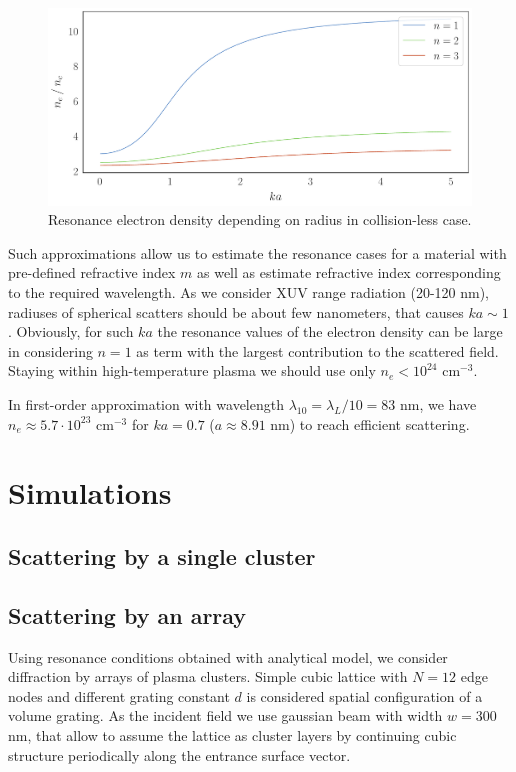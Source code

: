 \documentclass[conference]{IEEEtran}
\begin{document}
	\begin{figure}[htbp]
		\centerline{\includegraphics[width=\columnwidth]{../components/img/sph_base/nenc_123.pdf}}
		\caption{Resonance electron density depending on radius in collision-less case.}
		\label{nenc_123:image}
	\end{figure}

Such approximations allow us to estimate the resonance cases for a material with pre-defined refractive index $m$ as well as estimate refractive index corresponding to the required wavelength. As we consider XUV range radiation (20-120 nm), radiuses of spherical scatters should be about few nanometers, that causes $ka \sim 1$. Obviously, for such $ ka $ the resonance values of the electron density can be large in considering $n = 1$ as term with the largest contribution to the scattered field. Staying within high-temperature plasma we should use only $n_e < 10^{24}$ $\textrm{cm}^{-3}$.

In first-order approximation with wavelength $\lambda_{10} = \lambda_{L} / 10 = 83$ nm, we have $n_e \approx 5.7 \cdot 10^{23}$ $\textrm{cm}^{-3}$ for $ka = 0.7$ ($a \approx 8.91$ nm) to reach efficient scattering.

\section{Simulations}

\subsection{Scattering by a single cluster}

\subsection{Scattering by an array}

Using resonance conditions obtained with analytical model, we consider diffraction by arrays of plasma clusters. Simple cubic lattice with $N = 12$ edge nodes and different grating constant $d$ is considered spatial configuration of a volume grating. As the incident field we use gaussian beam with width $w = 300$ nm, that allow to assume the lattice as cluster layers by continuing cubic structure periodically along the entrance surface vector.
\end{document}
